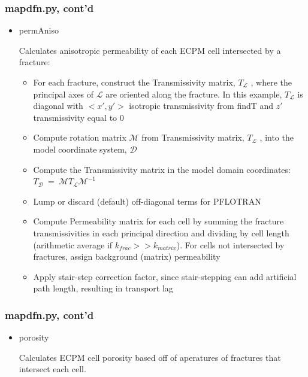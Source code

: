 \documentclass{beamer}
\newcommand{\eq}{\ =\ }
\def\gD{\mathcal D}
\def\M{\mathcal M}
\def\L{\mathcal L}
\newcommand\magentacomment[1]{{{\color{magenta} #1}}}
\begin{document}
\begin{frame} \frametitle{mapdfn.py, cont'd}
	\begin{itemize}
		\item \begin{semiverbatim}\magentacomment{permAniso}\end{semiverbatim} Calculates anisotropic permeability of each ECPM cell intersected by a fracture:
		\begin{itemize}
			\item For each fracture, construct the Transmissivity matrix, $T_{\L}$ , where the principal axes of $\L$ are oriented along the fracture. In this example, $T_{\L}$ is diagonal with $<x',y'>$ isotropic transmissivity from \magentacomment{findT} and $z'$ transmissivity equal to 0
			\item Compute rotation matrix $\M$ from Transmissivity matrix, $T_{\L}$ , into the model coordinate system, $\gD$
			\item Compute the Transmissivity matrix in the model domain coordinates: $T_{\gD} \eq \M  T_{\L} \M^{-1}$ 
			\item Lump or discard (default) off-diagonal terms for PFLOTRAN
			\item Compute Permeability matrix for each cell by summing the fracture transmissivities in each principal direction and dividing by cell length (arithmetic average if $k_{frac} >> k_{matrix}$). For cells not intersected by fractures, assign background (matrix) permeability
			\item Apply stair-step correction factor, since stair-stepping can add artificial path length, resulting in transport lag
		\end{itemize}
	\end{itemize}
	
\end{frame}

\begin{frame} \frametitle{mapdfn.py, cont'd}
	\begin{itemize}
		\item \begin{semiverbatim}\magentacomment{porosity}\end{semiverbatim} Calculates ECPM cell porosity based off of aperatures of fractures that intersect each cell.
	\end{itemize}
	
\end{frame}
\end{document}
